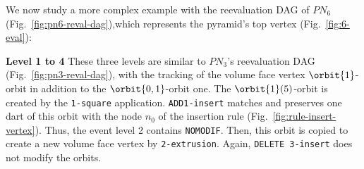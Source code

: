 We now study a more complex example with the reevaluation DAG of $PN_{6}$
(Fig.~\ref{fig:pn6-reval-dag}),which represents the pyramid's top vertex
(Fig.~\ref{fig:6-eval}): %

\textbf{Level 1 to 4} These three levels are similar to $PN_3$'s reevaluation
DAG (Fig.~\ref{fig:pn3-reval-dag}), with the tracking of the volume face vertex
$\orbit{1}$-orbit in addition to the $\orbit{0,1}$-orbit one. %
The $\orbit{1}(5)$-orbit is created by the \texttt{1-square} application. %
\texttt{ADD1-insert} matches and preserves one dart of this orbit with the node
$n_{0}$ of the insertion rule (Fig.~\ref{fig:rule-insert-vertex}). Thus, the
event level 2 contains \texttt{NOMODIF}. Then, this orbit is copied to create a
new volume face vertex by \texttt{2-extrusion}. Again,
\texttt{DELETE 3-insert} does not modify the orbits.

